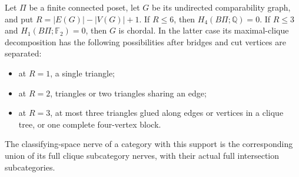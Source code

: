 \begin{lemma}
\label{C:small-cycle-support}
Let $\Pi$ be a finite connected poset, let $G$ be its
undirected comparability graph, and put
$R=|E(G)|-|V(G)|+1$.
If $R\leq6$, then $H_4(B\Pi;\mathbb Q)=0$.
If $R\leq3$ and $H_1(B\Pi;\mathbb F_2)=0$, then $G$ is
chordal.  In the latter case its maximal-clique decomposition
has the following possibilities after bridges and cut vertices
are separated:
\begin{itemize}
\item at $R=1$, a single triangle;
\item at $R=2$, triangles or two triangles sharing an edge;
\item at $R=3$, at most three triangles glued along edges or
vertices in a clique tree, or one complete four-vertex block.
\end{itemize}
The classifying-space nerve of a category with this support
is the corresponding union of its full clique subcategory
nerves, with their actual full intersection subcategories.
\end{lemma}
